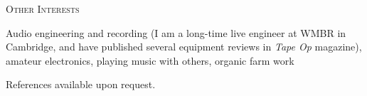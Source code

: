 \documentclass[12pt, letter]{article}
\newcommand{\cvsection}[1]{
  \vspace{3mm}

  \textsc{#1}

  \vspace{3mm}
}
\begin{document}
\cvsection{Other Interests}

Audio engineering and recording (I am a long-time live engineer at
WMBR in Cambridge, and have published several equipment reviews in
\emph{Tape Op} magazine), amateur electronics, playing music with
others, organic farm work




\vspace{10mm}

References available upon request.
\end{document}
